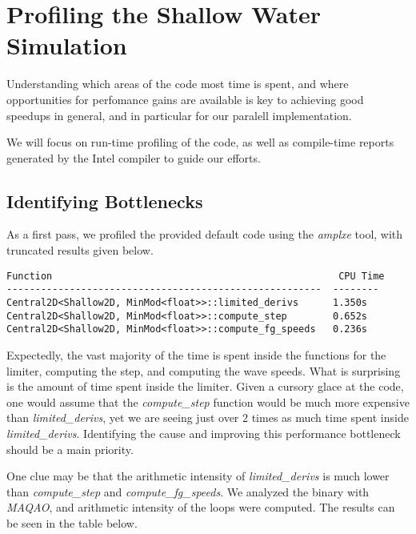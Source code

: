 \section{Profiling the Shallow Water Simulation}
\label{sec-profile}

Understanding which areas of the code most time is spent, and where opportunities for 
perfomance gains are available is key to achieving good speedups in general, and
in particular for our paralell implementation.

We will focus on run-time profiling of the code, as well as compile-time reports generated
by the Intel compiler to guide our efforts.

\subsection{Identifying Bottlenecks}
\label{sec-profile-bottlenecks}
As a first pass, we profiled the provided default code using the \emph{amplxe} tool, with 
truncated results given below.

\begin{lstlisting}
Function                                                  CPU Time
-------------------------------------------------------  -------- 
Central2D<Shallow2D, MinMod<float>>::limited_derivs      1.350s
Central2D<Shallow2D, MinMod<float>>::compute_step        0.652s
Central2D<Shallow2D, MinMod<float>>::compute_fg_speeds   0.236s 
\end{lstlisting}

Expectedly, the vast majority of the time is spent inside the functions for the limiter,
computing the step, and computing the wave speeds.  What is surprising is the amount of 
time spent inside the limiter.  Given a cursory glace at the code, one would assume that
the \emph{compute\_step} function would be much more expensive than \emph{limited\_derivs}, 
yet we are seeing just over 2 times as much time spent inside \emph{limited\_derivs}.
Identifying the cause and improving this performance bottleneck should be a main priority.

One clue may be that the arithmetic intensity of \emph{limited\_derivs} is much lower than
\emph{compute\_step} and \emph{compute\_fg\_speeds}.  We analyzed the binary with \emph{MAQAO},
and arithmetic intensity of the loops were computed.  The results can be seen in the table below.

